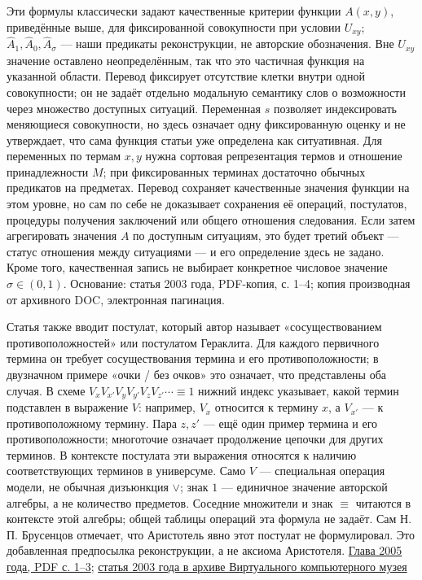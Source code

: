 \documentclass[12pt,a4paper]{article}
\begin{document}
Эти формулы классически задают качественные критерии функции \(A(x,y)\), приведённые выше, для фиксированной совокупности при условии \(U_{xy}\); \(\widehat A_1,\widehat A_0,\widehat A_\sigma\) — наши предикаты реконструкции, не авторские обозначения. Вне \(U_{xy}\) значение оставлено неопределённым, так что это частичная функция на указанной области. Перевод фиксирует отсутствие клетки внутри одной совокупности; он не задаёт отдельно модальную семантику слов о возможности через множество доступных ситуаций. Переменная \(s\) позволяет индексировать меняющиеся совокупности, но здесь означает одну фиксированную оценку и не утверждает, что сама функция статьи уже определена как ситуативная. Для переменных по термам \(x,y\) нужна сортовая репрезентация термов и отношение принадлежности \(M\); при фиксированных терминах достаточно обычных предикатов на предметах. Перевод сохраняет качественные значения функции на этом уровне, но сам по себе не доказывает сохранения её операций, постулатов, процедуры получения заключений или общего отношения следования. Если затем агрегировать значения \(A\) по доступным ситуациям, это будет третий объект — статус отношения между ситуациями — и его определение здесь не задано. Кроме того, качественная запись не выбирает конкретное числовое значение \(\sigma\in(0,1)\). Основание: статья 2003 года, PDF-копия, с. 1–4; копия производная от архивного DOC, электронная пагинация.

Статья также вводит постулат, который автор называет «сосуществованием противоположностей» или постулатом Гераклита. Для каждого первичного термина он требует сосуществования термина и его противоположности; в двузначном примере «очки / без очков» это означает, что представлены оба случая. В схеме \(V_xV_{x'}V_yV_{y'}V_zV_{z'}\cdots\equiv1\) нижний индекс указывает, какой термин подставлен в выражение \(V\): например, \(V_x\) относится к термину \(x\), а \(V_{x'}\) — к противоположному термину. Пара \(z,z'\) — ещё один пример термина и его противоположности; многоточие означает продолжение цепочки для других терминов. В контексте постулата эти выражения относятся к наличию соответствующих терминов в универсуме. Само \(V\) — специальная операция модели, не обычная дизъюнкция \(\lor\); знак \(1\) — единичное значение авторской алгебры, а не количество предметов. Соседние множители и знак \(\equiv\) читаются в контексте этой алгебры; общей таблицы операций эта формула не задаёт. Сам Н. П. Брусенцов отмечает, что Аристотель явно этот постулат не формулировал. Это добавленная предпосылка реконструкции, а не аксиома Аристотеля. \href{https://ternarycomp.cs.msu.ru/Papers/Rea.pdf}{Глава 2005 года, PDF с. 1–3}; \href{https://computer-museum.ru/histussr/trilog0.htm}{статья 2003 года в архиве Виртуального компьютерного музея}
\end{document}
